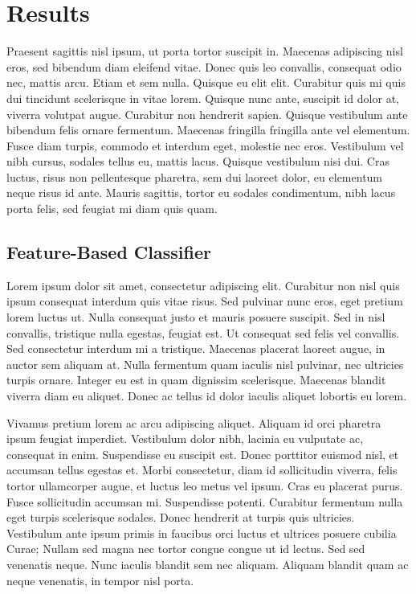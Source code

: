 \documentclass[preprint,5p,times,twocolumn]{elsarticle}
\begin{document}
\section{Results}
\label{results}

Praesent sagittis nisl ipsum, ut porta tortor suscipit in. Maecenas adipiscing
nisl eros, sed bibendum diam eleifend vitae. Donec quis leo convallis,
consequat odio nec, mattis arcu. Etiam et sem nulla. Quisque eu elit elit.
Curabitur quis mi quis dui tincidunt scelerisque in vitae lorem. Quisque nunc
ante, suscipit id dolor at, viverra volutpat augue. Curabitur non hendrerit
sapien. Quisque vestibulum ante bibendum felis ornare fermentum. Maecenas
fringilla fringilla ante vel elementum. Fusce diam turpis, commodo et interdum
eget, molestie nec eros. Vestibulum vel nibh cursus, sodales tellus eu, mattis
lacus. Quisque vestibulum nisi dui. Cras luctus, risus non pellentesque
pharetra, sem dui laoreet dolor, eu elementum neque risus id ante. Mauris
sagittis, tortor eu sodales condimentum, nibh lacus porta felis, sed feugiat mi
diam quis quam.

\subsection{Feature-Based Classifier}
\label{results:featurebased}

Lorem ipsum dolor sit amet, consectetur adipiscing elit. Curabitur non nisl
quis ipsum consequat interdum quis vitae risus. Sed pulvinar nunc eros, eget
pretium lorem luctus ut. Nulla consequat justo et mauris posuere suscipit. Sed
in nisl convallis, tristique nulla egestas, feugiat est. Ut consequat sed felis
vel convallis. Sed consectetur interdum mi a tristique. Maecenas placerat
laoreet augue, in auctor sem aliquam at. Nulla fermentum quam iaculis nisl
pulvinar, nec ultricies turpis ornare. Integer eu est in quam dignissim
scelerisque. Maecenas blandit viverra diam eu aliquet. Donec ac tellus id dolor
iaculis aliquet lobortis eu lorem.

Vivamus pretium lorem ac arcu adipiscing aliquet. Aliquam id orci pharetra
ipsum feugiat imperdiet. Vestibulum dolor nibh, lacinia eu vulputate ac,
consequat in enim. Suspendisse eu suscipit est. Donec porttitor euismod nisl,
et accumsan tellus egestas et. Morbi consectetur, diam id sollicitudin viverra,
felis tortor ullamcorper augue, et luctus leo metus vel ipsum. Cras eu placerat
purus. Fusce sollicitudin accumsan mi. Suspendisse potenti. Curabitur fermentum
nulla eget turpis scelerisque sodales. Donec hendrerit at turpis quis
ultricies. Vestibulum ante ipsum primis in faucibus orci luctus et ultrices
posuere cubilia Curae; Nullam sed magna nec tortor congue congue ut id lectus.
Sed sed venenatis neque. Nunc iaculis blandit sem nec aliquam. Aliquam blandit
quam ac neque venenatis, in tempor nisl porta.
\end{document}

